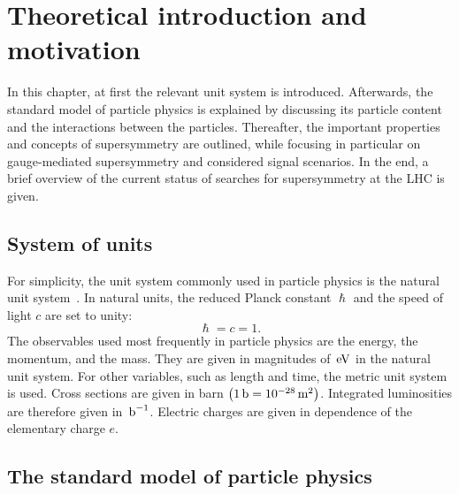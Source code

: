\chapter{Theoretical introduction and motivation}\label{chap:introduction}
\minitoc

In this chapter, at first the relevant unit system is introduced. Afterwards, the standard model of particle physics is explained by discussing its particle content and the interactions between the particles. Thereafter, the important properties and concepts of supersymmetry are outlined, while focusing in particular on gauge-mediated supersymmetry and considered signal scenarios. In the end, a brief overview of the current status of searches for supersymmetry at the LHC is given.



\section{System of units}\label{sec:units}

For simplicity, the unit system commonly used in particle physics is the natural unit system~\cite{UnitSystem}. In natural units, the reduced Planck constant $\hslash$ and the speed of light $c$ are set to unity:
\begin{equation}
 \hslash=c=1.
\end{equation}
The observables used most frequently in particle physics are the energy, the momentum, and the mass. They are given in magnitudes of $\,\text{e\hspace{-.08em}V}$ in the natural unit system. For other variables, such as length and time, the metric unit system is used. Cross sections are given in barn $\left(1\,\text{b}=10^{-28}\,\text{m}^2\right)$. Integrated luminosities are therefore given in $\mbox{\ensuremath{\,\text{b}^\text{$-$1}}}$. Electric charges are given in dependence of the elementary charge $e$.

\section{The standard model of particle physics}\label{sec:SM}

